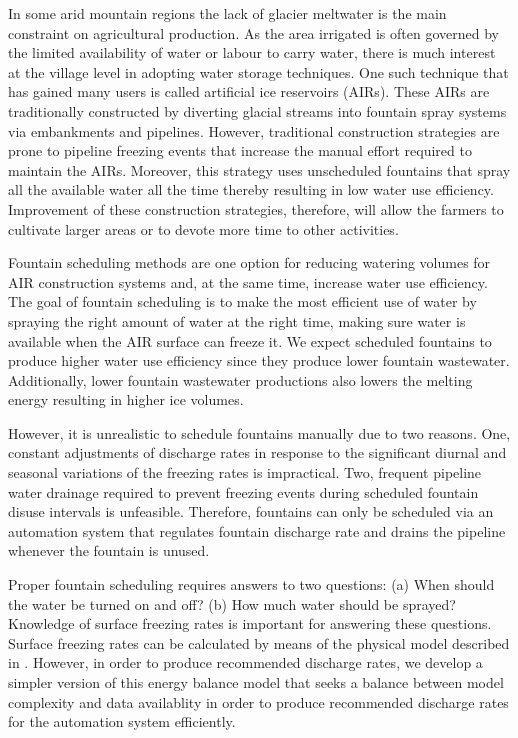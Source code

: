 \documentclass[tc, manuscript]{copernicus}
\begin{document}
\introduction

In some arid mountain regions the lack of glacier meltwater is the main constraint on agricultural production.
As the area irrigated is often governed by the limited availability of water or labour to carry water, there is
much interest at the village level in adopting water storage techniques. One such technique that has gained many
users is called artificial ice reservoirs (AIRs). These AIRs are traditionally constructed by diverting glacial
streams into fountain spray systems via embankments and pipelines. However, traditional construction strategies
are prone to pipeline freezing events that increase the manual effort required to maintain the AIRs. Moreover,
this strategy uses unscheduled fountains that spray all the available water all the time thereby resulting in
low water use efficiency. Improvement of these construction strategies, therefore, will allow the farmers to
cultivate larger areas or to devote more time to other activities. 

Fountain scheduling methods are one option for reducing watering volumes for AIR construction systems and, at
the same time, increase water use efficiency. The goal of fountain scheduling is to make the most efficient use
of water by spraying the right amount of water at the right time, making sure water is available when the AIR
surface can freeze it. We expect scheduled fountains to produce higher water use efficiency since they produce
lower fountain wastewater. Additionally, lower fountain wastewater productions also lowers the melting energy
resulting in higher ice volumes.

However, it is unrealistic to schedule fountains manually due to two reasons. One, constant adjustments of
discharge rates in response to the significant diurnal and seasonal variations of the freezing rates is
impractical. Two, frequent pipeline water drainage required to prevent freezing events during scheduled fountain
disuse intervals is unfeasible. Therefore, fountains can only be scheduled via an automation system that
regulates fountain discharge rate and drains the pipeline whenever the fountain is unused.

Proper fountain scheduling requires answers to two questions: (a) When should the water be turned on and off?
(b) How much water should be sprayed? Knowledge of surface freezing rates is important for answering these
questions. Surface freezing rates can be calculated by means of the physical model described in
\cite{balasubramanianInfluenceMeteorologicalConditions2022}. However, in order to produce recommended discharge
rates, we develop a simpler version of this energy balance model that seeks a balance between model complexity and
data availablity in order to produce recommended discharge rates for the automation system efficiently.
\end{document}
